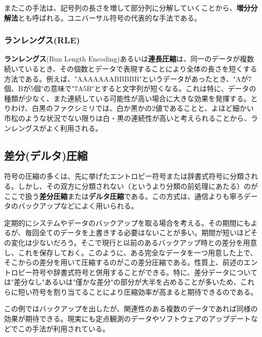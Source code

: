 またこの手法は、記号列の長さを増して部分列に分解していくことから、\textbf{増分分解法}とも呼ばれる。ユニバーサル符号の代表的な手法である。

\subsubsection{ランレングス(RLE)}
\textbf{ランレングス}(Run Length Encoding)あるいは\textbf{連長圧縮}は、同一のデータが複数続いているとき、その個数とデータで表現することにより全体の長さを短くする方法である。例えば、"AAAAAAABBBBB"というデータがあったとき、"Aが7個、Bが5個"の意味で"7A5B"とすると文字列が短くなる。これは特に、データの種類が少なく、また連続している可能性が高い場合に大きな効果を発揮する。とりわけ、白黒のファクシミリでは、白か黒かの2値であることと、よほど細かい市松のような状況でない限りは白・黒の連続性が高いと考えられることから、ランレングスがよく利用される。

\subsection{差分(デルタ)圧縮}
符号の圧縮の多くは、先に挙げたエントロピー符号または辞書式符号に分類される。しかし、その双方に分類されない（というより分類の前処理にあたる）のがここで扱う\textbf{差分圧縮}または\textbf{デルタ圧縮}である。この方式は、通信よりも寧ろデータのバックアップなどによく用いられる。

定期的にシステムやデータのバックアップを取る場合を考える。その期間にもよるが、毎回全てのデータを上書きする必要はないことが多い。期間が短いほどその変化は少ないだろう。そこで現行と以前のあるバックアップ時との差分を用意し、これを保存しておく。このように、ある完全なデータを一つ用意した上で、そこからの差分を用いて圧縮するのがこの差分圧縮である。性質上、前述のエントロピー符号や辞書式符号と併用することができる。特に、差分データについては"差分なし"あるいは"僅かな差分"の部分が大半を占めることが多いため、これらに短い符号を割り当てることにより圧縮効率が高まると期待できるのである。

この例ではバックアップを出したが、関連性のある複数のデータであれば同様の効果が期待できる。現実にも定点観測のデータやソフトウェアのアップデートなどでこの手法が利用されている。


